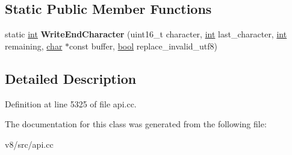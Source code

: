 \subsection*{Static Public Member Functions}
\begin{DoxyCompactItemize}
\item 
\mbox{\label{classv8_1_1Utf8WriterVisitor_a2eebbdadedbf85598f175196b22cfe48}} 
static \mbox{\hyperlink{classint}{int}} {\bfseries Write\+End\+Character} (uint16\+\_\+t character, \mbox{\hyperlink{classint}{int}} last\+\_\+character, \mbox{\hyperlink{classint}{int}} remaining, \mbox{\hyperlink{classchar}{char}} $\ast$const buffer, \mbox{\hyperlink{classbool}{bool}} replace\+\_\+invalid\+\_\+utf8)
\end{DoxyCompactItemize}


\subsection{Detailed Description}


Definition at line 5325 of file api.\+cc.



The documentation for this class was generated from the following file\+:\begin{DoxyCompactItemize}
\item 
v8/src/api.\+cc\end{DoxyCompactItemize}
